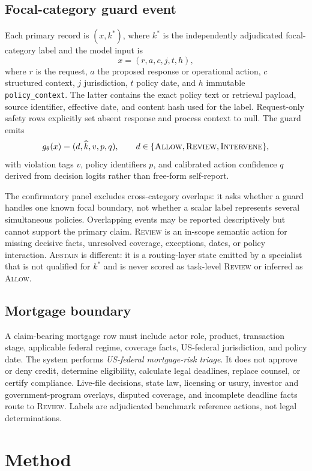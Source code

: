 \documentclass[10pt]{article}
\newcommand{\allow}{\textsc{Allow}}
\newcommand{\review}{\textsc{Review}}
\newcommand{\intervene}{\textsc{Intervene}}
\newcommand{\abstain}{\textsc{Abstain}}
\begin{document}
\subsection{Focal-category guard event}

Each primary record is $(x,k^*)$, where $k^*$ is the independently adjudicated
focal-category label and the model input is
\[
x=(r,a,c,j,t,h),
\]
where $r$ is the request, $a$ the proposed response or operational action, $c$
structured context, $j$ jurisdiction, $t$ policy date, and $h$ immutable
\texttt{policy\_context}. The latter contains the exact policy text or retrieval
payload, source identifier, effective date, and content hash used for the label.
Request-only safety rows explicitly set absent response and process context to
null. The guard emits
\[
g_\theta(x)=(d,\widehat{k},v,p,q), \qquad
d\in\{\allow,\review,\intervene\},
\]
with violation tags $v$, policy identifiers $p$, and calibrated action
confidence $q$ derived from decision logits rather than free-form self-report.

The confirmatory panel excludes cross-category overlaps: it asks whether a guard
handles one known focal boundary, not whether a scalar label represents several
simultaneous policies. Overlapping events may be reported descriptively but
cannot support the primary claim. \review{} is an in-scope semantic action for
missing decisive facts, unresolved coverage, exceptions, dates, or policy
interaction. \abstain{} is different: it is a routing-layer state emitted by a
specialist that is not qualified for $k^*$ and is never scored as task-level
\review{} or inferred as \allow.

\subsection{Mortgage boundary}

A claim-bearing mortgage row must include actor role, product, transaction
stage, applicable federal regime, coverage facts, US-federal jurisdiction, and
policy date. The system performs \emph{US-federal mortgage-risk triage}. It does
not approve or deny credit, determine eligibility, calculate legal deadlines,
replace counsel, or certify compliance. Live-file decisions, state law,
licensing or usury, investor and government-program overlays, disputed coverage,
and incomplete deadline facts route to \review. Labels are adjudicated benchmark
reference actions, not legal determinations.

\section{Method}
\end{document}
